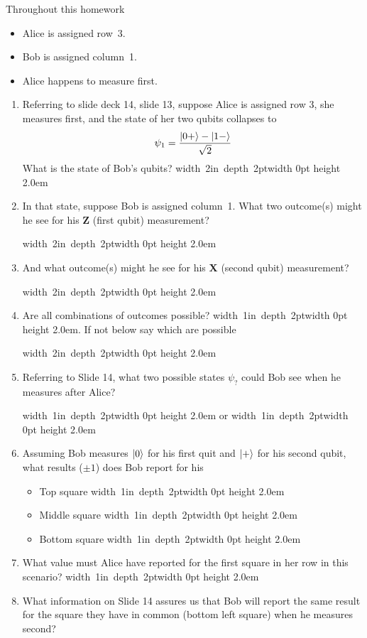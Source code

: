 \documentclass[12pt]{article}
\newcommand{\Blank}[1][1in]{\mbox{\hskip 4pt\vrule width #1 depth 2pt}\vrule width 0pt height 2.0em}
\begin{document}
Throughout this homework
\begin{itemize}
    \item Alice is assigned row~3.
    \item Bob is assigned column~1.  
    \item Alice happens to measure first.
    \end{itemize}
\begin{enumerate}[font=\bfseries]
    \item Referring to slide deck 14, slide 13, suppose Alice is assigned row 3, she measures first, and the state of her two qubits collapses to \[ \psi_{1}=\frac{\ket{0+}-\ket{1-}}{\sqrt{2}} \]
    What is the state of Bob's qubits? \Blank[2in]
    \clearpage
    \item In that state, suppose Bob is assigned column~1.  What two outcome(s) might he see for his \textbf{Z} (first qubit) measurement?
    
    \Blank[2in]
    \item And what outcome(s) might he see for his \textbf{X} (second qubit) measurement?
    
    \Blank[2in]
    
    \item Are all combinations of outcomes possible?  \Blank{}.  If not below say which are possible
    
    \Blank[2in]{}
    \item Referring to Slide 14, what two possible states $\psi_{?}$ could Bob see when he measures after Alice?
    
    \Blank{} or \Blank{}
    \item Assuming Bob measures $\ket{0}$ for his first quit and $\ket{+}$ for his second qubit, what results ($\pm 1$) does Bob report for his
    \begin{itemize}
        \item Top square \Blank{}
        \item Middle square \Blank{}
        \item Bottom square \Blank{}
    \end{itemize}
    \item What value must Alice have reported for the first square in her row in this scenario? \Blank{}
    \clearpage
    \item What information on Slide 14 assures us that Bob will report the same result for the square they have in common (bottom left square) when he measures second?
    
\end{enumerate}
\end{document}

